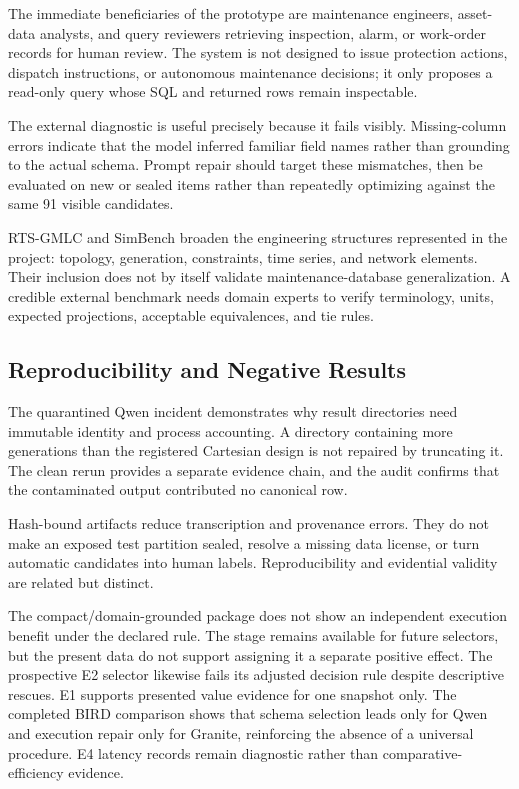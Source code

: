 \documentclass[applsci,article,submit,moreauthors]{Definitions/mdpi}
\begin{document}
The immediate beneficiaries of the prototype are maintenance engineers, asset-data analysts, and query reviewers retrieving inspection, alarm, or work-order records for human review. The system is not designed to issue protection actions, dispatch instructions, or autonomous maintenance decisions; it only proposes a read-only query whose SQL and returned rows remain inspectable.

The external diagnostic is useful precisely because it fails visibly. Missing-column errors indicate that the model inferred familiar field names rather than grounding to the actual schema. Prompt repair should target these mismatches, then be evaluated on new or sealed items rather than repeatedly optimizing against the same 91 visible candidates.

RTS-GMLC and SimBench broaden the engineering structures represented in the project: topology, generation, constraints, time series, and network elements. Their inclusion does not by itself validate maintenance-database generalization. A credible external benchmark needs domain experts to verify terminology, units, expected projections, acceptable equivalences, and tie rules.

\subsection{Reproducibility and Negative Results}
The quarantined Qwen incident demonstrates why result directories need immutable identity and process accounting. A directory containing more generations than the registered Cartesian design is not repaired by truncating it. The clean rerun provides a separate evidence chain, and the audit confirms that the contaminated output contributed no canonical row.

Hash-bound artifacts reduce transcription and provenance errors. They do not make an exposed test partition sealed, resolve a missing data license, or turn automatic candidates into human labels. Reproducibility and evidential validity are related but distinct.

The compact/domain-grounded package does not show an independent execution benefit under the declared rule. The stage remains available for future selectors, but the present data do not support assigning it a separate positive effect. The prospective E2 selector likewise fails its adjusted decision rule despite descriptive rescues. E1 supports presented value evidence for one snapshot only. The completed BIRD comparison shows that schema selection leads only for Qwen and execution repair only for Granite, reinforcing the absence of a universal procedure. E4 latency records remain diagnostic rather than comparative-efficiency evidence.
\end{document}
